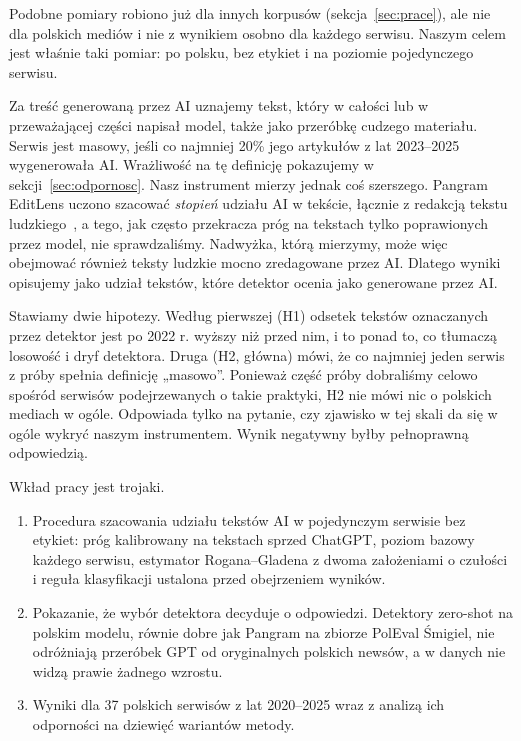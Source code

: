 \documentclass[11pt,a4paper]{article}
\begin{document}
Podobne pomiary robiono już dla innych korpusów (sekcja~\ref{sec:prace}), ale nie dla polskich mediów i nie z wynikiem osobno dla każdego serwisu. Naszym celem jest właśnie taki pomiar: po polsku, bez etykiet i na poziomie pojedynczego serwisu.

Za treść generowaną przez AI uznajemy tekst, który w całości lub w przeważającej części napisał model, także jako przeróbkę cudzego materiału. Serwis jest masowy, jeśli co najmniej 20\% jego artykułów z lat 2023--2025 wygenerowała AI. Wrażliwość na tę definicję pokazujemy w sekcji~\ref{sec:odpornosc}. Nasz instrument mierzy jednak coś szerszego. Pangram EditLens uczono szacować \emph{stopień} udziału AI w tekście, łącznie z redakcją tekstu ludzkiego~\cite{editlens}, a tego, jak często przekracza próg na tekstach tylko poprawionych przez model, nie sprawdzaliśmy. Nadwyżka, którą mierzymy, może więc obejmować również teksty ludzkie mocno zredagowane przez AI. Dlatego wyniki opisujemy jako udział tekstów, które detektor ocenia jako generowane przez AI.

Stawiamy dwie hipotezy. Według pierwszej (H1) odsetek tekstów oznaczanych przez detektor jest po 2022 r. wyższy niż przed nim, i to ponad to, co tłumaczą losowość i dryf detektora. Druga (H2, główna) mówi, że co najmniej jeden serwis z próby spełnia definicję „masowo”. Ponieważ część próby dobraliśmy celowo spośród serwisów podejrzewanych o takie praktyki, H2 nie mówi nic o polskich mediach w ogóle. Odpowiada tylko na pytanie, czy zjawisko w tej skali da się w ogóle wykryć naszym instrumentem. Wynik negatywny byłby pełnoprawną odpowiedzią.

Wkład pracy jest trojaki.
\begin{enumerate}
\item Procedura szacowania udziału tekstów AI w pojedynczym serwisie bez etykiet: próg kalibrowany na tekstach sprzed ChatGPT, poziom bazowy każdego serwisu, estymator Rogana--Gladena z dwoma założeniami o czułości i reguła klasyfikacji ustalona przed obejrzeniem wyników.
\item Pokazanie, że wybór detektora decyduje o odpowiedzi. Detektory zero-shot na polskim modelu, równie dobre jak Pangram na zbiorze PolEval Śmigiel, nie odróżniają przeróbek GPT od oryginalnych polskich newsów, a w danych nie widzą prawie żadnego wzrostu.
\item Wyniki dla 37 polskich serwisów z lat 2020--2025 wraz z analizą ich odporności na dziewięć wariantów metody.
\end{enumerate}
\end{document}
